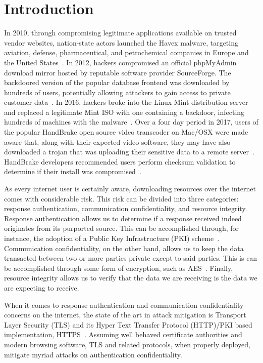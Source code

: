 \section{Introduction} \label{sec:introduction}

In 2010, through compromising legitimate applications available on trusted
vendor websites, nation-state actors launched the Havex malware, targeting
aviation, defense, pharmaceutical, and petrochemical companies in Europe and the
United States~\cite{SCA-HAVEX}. In 2012, hackers compromised an official
phpMyAdmin download mirror hosted by reputable software provider SourceForge.
The backdoored version of the popular database frontend was downloaded by
hundreds of users, potentially allowing attackers to gain access to private
customer data~\cite{SCA-PMA1, SCA-PMA2}. In 2016, hackers broke into the Linux
Mint distribution server and replaced a legitimate Mint ISO with one containing
a backdoor, infecting hundreds of machines with the malware~\cite{SCA-MINT1,
SCA-MINT2}. Over a four day period in 2017, users of the popular HandBrake open
source video transcoder on Mac/OSX were made aware that, along with their
expected video software, they may have also downloaded a trojan that was
uploading their sensitive data to a remote server~\cite{SCA-HB1}. HandBrake
developers recommended users perform checksum validation to determine if their
install was compromised~\cite{SCA-HB2}.

As every internet user is certainly aware, downloading resources over the
internet comes with considerable risk. This risk can be divided into three
categories: response authentication, communication confidentiality, and resource
integrity. Response authentication allows us to determine if a response received
indeed originates from its purported source. This can be accomplished through,
for instance, the adoption of a Public Key Infrastructure (PKI)
scheme~\cite{PKI}. Communication confidentiality, on the other hand, allows us
to keep the data transacted between two or more parties private except to said
parties. This is can be accomplished through some form of encryption, such as
AES~\cite{AES}. Finally, resource integrity allows us to verify that the data we
are receiving is the data we are expecting to receive.

When it comes to response authentication and communication confidentiality
concerns on the internet, the state of the art in attack mitigation is Transport
Layer Security (TLS) and its Hyper Text Transfer Protocol (HTTP)/PKI based
implementation, HTTPS~\cite{TLS1.2, TLS1, TLS0, HTTPS, PKI}. Assuming well
behaved certificate authorities and modern browsing software, TLS and related
protocols, when properly deployed, mitigate myriad attacks on authentication
confidentiality.


